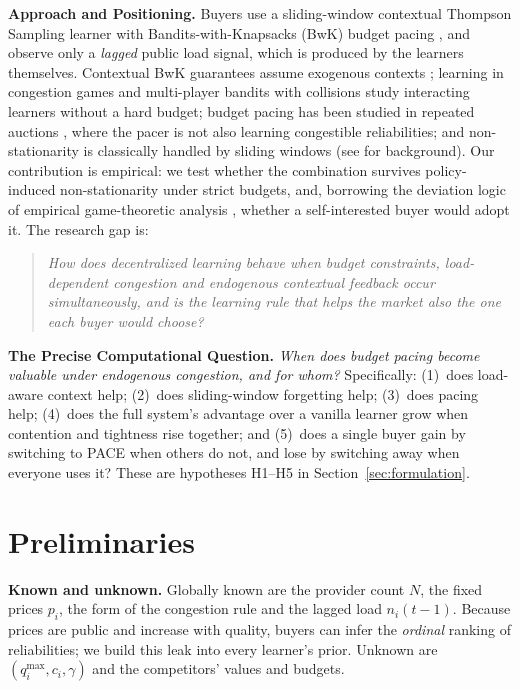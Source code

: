 \documentclass{article}
\begin{document}
\textbf{Approach and Positioning.} Buyers use a sliding-window contextual Thompson Sampling learner \cite{thompson1933,russo2018} with Bandits-with-Knapsacks (BwK) budget pacing \cite{badanidiyuru2013,agrawal2016}, and observe only a \emph{lagged} public load signal, which is produced by the learners themselves. Contextual BwK guarantees assume exogenous contexts \cite{agrawal2016}; learning in congestion games \cite{rosenthal1973,roughgarden2002,kleinberg2009} and multi-player bandits with collisions \cite{rosenski2016,boursier2019} study interacting learners without a hard budget; budget pacing has been studied in repeated auctions \cite{balseiro2019}, where the pacer is not also learning congestible reliabilities; and non-stationarity is classically handled by sliding windows \cite{garivier2011} (see \cite{slivkins2019,busoniu2008} for background). Our contribution is empirical: we test whether the combination survives policy-induced non-stationarity under strict budgets, and, borrowing the deviation logic of empirical game-theoretic analysis \cite{wellman2006}, whether a self-interested buyer would adopt it. The research gap is:
\begin{quote}\itshape
How does decentralized learning behave when budget constraints, load-dependent congestion and endogenous contextual feedback occur simultaneously, and is the learning rule that helps the market also the one each buyer would choose?
\end{quote}
\textbf{The Precise Computational Question.} \emph{When does budget pacing become valuable under endogenous congestion, and for whom?} Specifically: (1)~does load-aware context help; (2)~does sliding-window forgetting help; (3)~does pacing help; (4)~does the full system's advantage over a vanilla learner grow when contention and tightness rise together; and (5)~does a single buyer gain by switching to PACE when others do not, and lose by switching away when everyone uses it? These are hypotheses H1--H5 in Section~\ref{sec:formulation}.

\section{Preliminaries}
\textbf{Known and unknown.} Globally known are the provider count $N$, the fixed prices $p_i$, the form of the congestion rule and the lagged load $n_i(t-1)$. Because prices are public and increase with quality, buyers can infer the \emph{ordinal} ranking of reliabilities; we build this leak into every learner's prior. Unknown are $(q_i^{\max},c_i,\gamma)$ and the competitors' values and budgets.
\end{document}
